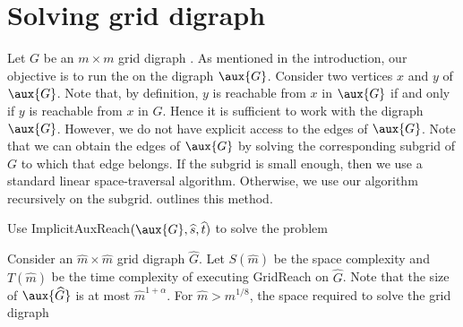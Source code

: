 \documentclass{toc}
\begin{document}
\section{Solving grid %
digraph %
}
\label{sec:final}
Let $G$ be an $m \times m$ grid %
digraph %
. As mentioned in the introduction, our objective is to run the  on the %
digraph %
 $\aux{G}$. Consider two vertices $x$ and $y$ of $\aux{G}$. Note that, by definition, $y$ is reachable from $x$ in $\aux{G}$ if and only if $y$ is reachable from $x$ in $G$. Hence it is sufficient to work with the %
digraph %
 $\aux{G}$. However, we do not have explicit access to the edges of $\aux{G}$. Note that we can obtain the edges of $\aux{G}$ by solving the corresponding subgrid of $G$ to which that edge belongs. If the subgrid is small enough, then we use a standard linear %
space-traversal  %
algorithm. Otherwise, we use our algorithm recursively on the subgrid.  outlines this method.
\begin{algorithm}
\caption{\textsf{GridReach}$(\widehat{G}, \widehat{s}, \widehat{t}, m)$}
\label{alg:gridreach}
\Else
{
Use \textsf{ImplicitAuxReach}$(\aux{G}, \widehat{s}, \widehat{t})$ to solve the problem\;
}
\end{algorithm}

Consider an $\widehat{m} \times \widehat{m}$ grid %
digraph %
 $\widehat{G}$. Let $S(\widehat{m})$ be the space complexity and $T(\widehat{m})$ be the time complexity of executing \textsf{GridReach} on $\widehat{G}$. Note that the size of $\aux{\widehat{G}}$ is at most $\widehat{m}^{1 + \alpha}$. For $\widehat{m} > m^{1/8}$, the space required to solve the grid %
digraph %
\end{document}
